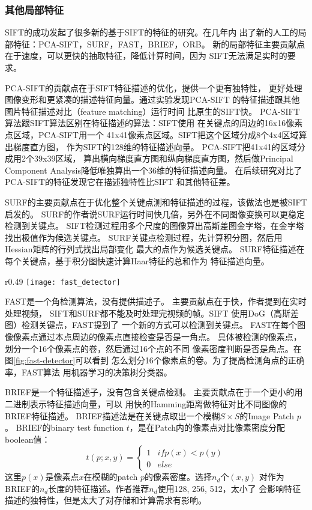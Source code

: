 \subsubsection{其他局部特征}
SIFT的成功发起了很多新的基于SIFT的特征的研究。在几年内
出了新的人工的局部特征：PCA-SIFT，SURF，FAST，BRIEF，ORB。
\cite{ke2004pca, bay2006surf, fast2006machine, calonder2010brief, rublee2011orb}
新的局部特征主要贡献点在于速度，可以更快的抽取特征，降低计算时间，因为
SIFT无法满足实时的要求。\cite{juan2009comparison, calonder2010brief}

PCA-SIFT的贡献点在于SIFT特征描述的优化，提供一个更有独特性，
更好处理图像变形和更紧凑的描述特征向量。通过实验发现PCA-SIFT
的特征描述跟其他图片特征描述对比（feature matching）运行时间
比原生的SIFT快。\cite{ke2004pca}
PCA-SIFT算法跟SIFT算法区别在特征描述的算法：SIFT使用
在关键点的周边的16x16像素点区域，PCA-SIFT用一个
41x41像素点区域。SIFT把这个区域分成8个4x4区域算出梯度直方图，
作为SIFT的128维的特征描述向量。
PCA-SIFT把41x41的区域分成用2个39x39区域，
算出横向梯度直方图和纵向梯度直方图，然后做Principal Component
Analysis降低唯独算出一个36维的特征描述向量。
在后续研究对比了PCA-SIFT的特征发现它在描述独特性比SIFT
和其他特征差。\cite{mikolajczyk2005performance}

SURF的主要贡献点在于优化整个关键点测和特征描述的过程，该做法也是被SIFT启发的。
SURF的作者说SURF运行时间快几倍，另外在不同图像变换可以更稳定检测到关键点。\cite{bay2006surf}
SIFT检测过程用多个尺度的图像算出高斯差图金字塔，在金字塔找出极值作为候选关键点。
SURF关键点检测过程，先计算积分图，然后用Hessian矩阵的行列式找出局部变化
最大的点作为候选关键点。
SURF特征描述在每个关键点，基于积分图快速计算Haar特征的总和作为
特征描述向量。

\begin{wrapfigure}{r}{0.49\textwidth}
  \centering
    \texttt{[image: fast\_detector]}
    \caption{FAST检测角点做法。\cite{fast2006machine}}
  \label{fig:fast-detector}
\end{wrapfigure}

FAST是一个角检测算法，没有提供描述子。
主要贡献点在于快，作者提到在实时处理视频，
SIFT和SURF都不能及时处理完视频的帧。SIFT
使用DoG（高斯差图）检测关键点，FAST提到了
一个新的方式可以检测到关键点。
FAST在每个图像像素点通过本点周边的像素点直接检查是否是一角点。
具体被检测的像素点，划分一个16个像素点的卷，然后通过16个点的不同
像素密度判断是否是角点。在图\ref{fig:fast-detector}可以看到
怎么划分16个像素点的卷。为了提高检测角点的正确率，FAST算法
用机器学习的决策树分类器。

BRIEF是一个特征描述子，没有包含关键点检测。\cite{calonder2010brief}
主要贡献点在于一个更小的用二进制表示特征描述向量，可以
用快的Hamming距离做特征对比不同图像的BRIEF特征描述。
BRIEF描述法是在关键点取出一个模糊$S \times S$的Image Patch $p$。
BRIEF的binary test function $t$，是在Patch内的像素点对比像素密度分配boolean值：
$$
t(p; x, y) = \begin{cases} 
      1 & if p(x) < p(y) \\
      0 & else 
 \end{cases}
$$
这里$p(x)$是像素点$x$在模糊的patch $p$的像素密度。选择$n_d$个$(x, y)$
对作为BRIEF的$n_d$长度的特征描述。作者推荐$n_d$使用128, 256, 512，太小了
会影响特征描述的独特性，但是太大了对存储和计算需求有影响。

